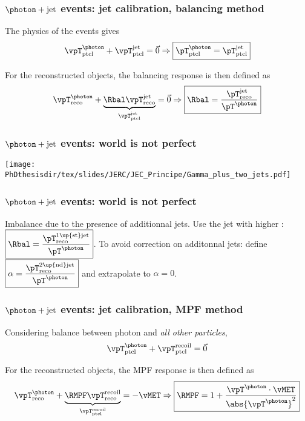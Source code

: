 \begin{frame}
\frametitle{$\photon+\text{jet}$ events: jet calibration, balancing method}
\manip The physics of the events gives
\begin{equation*}
\vpT^\photon_\text{ptcl} + \vpT^\text{jet}_\text{ptcl} = \vec{0} \Rightarrow \boxed{{\pT}^\photon_\text{ptcl} = {\pT}^\text{jet}_\text{ptcl}}
\end{equation*}

\pause
\vfill

\manip For the reconstructed objects, the balancing response is then defined as
\begin{equation*}
\vpT^\photon_\text{reco} + \underbrace{\Rbal \vpT^\text{jet}_\text{reco}}_{\vpT^\text{jet}_\text{ptcl}} = \vec{0}
\Rightarrow
\boxed{\Rbal = \frac{{\pT}^\text{jet}_\text{reco}}{\pT^\photon}}
\end{equation*}
\end{frame}

\begin{frame}
\frametitle{$\photon+\text{jet}$ events: world is not perfect}
\begin{center}
\texttt{[image: \\PhDthesisdir/tex/slides/JERC/JEC\_Principe/Gamma\_plus\_two\_jets.pdf]}
\end{center}
\end{frame}

\begin{frame}
\frametitle{$\photon+\text{jet}$ events: world is not perfect}
\manip Imbalance due to the presence of additionnal jets.
\pause
\manip Use the jet with higher \pT: $\displaystyle \boxed{\Rbal = \frac{{\pT}^\text{1\up{st}jet}_\text{reco}}{\pT^\photon}}$.
\pause
\manip To avoid correction on additonnal jets: define $\displaystyle \boxed{\alpha = \frac{{\pT}^\text{2\up{nd}jet}_\text{reco}}{\pT^\photon}}$ and extrapolate to $\alpha=0$.
\end{frame}

\begin{frame}
\frametitle{$\photon+\text{jet}$ events: jet calibration, MPF method}
\manip Considering balance between photon and \emph{all other particles},
\begin{equation*}
\vpT^\photon_\text{ptcl} + \vpT^\text{recoil}_\text{ptcl} = \vec{0}
\end{equation*}

\pause
\vfill

\manip For the reconstructed objects, the MPF response is then defined as
\begin{equation*}
\vpT^\photon_\text{reco} + \underbrace{\RMPF \vpT^\text{recoil}_\text{reco}}_{\vpT^\text{recoil}_\text{ptcl}} = -\vMET
\Rightarrow
\boxed{\RMPF = 1 + \frac{\vpT^\photon\cdot\vMET}{\abs{\vpT^\photon}^2}}
\end{equation*}
\end{frame}